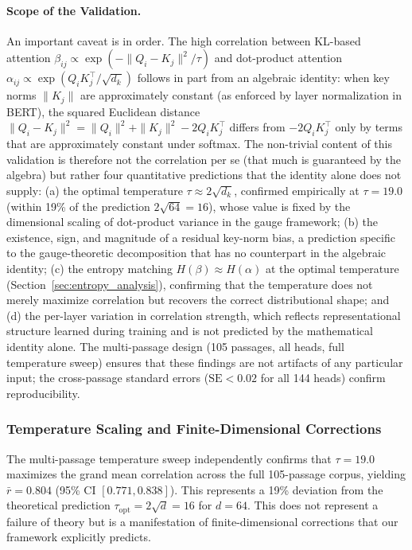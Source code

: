 \documentclass[twoside,11pt]{article}
\begin{document}
\paragraph{Scope of the Validation.}
An important caveat is in order. The high correlation between KL-based attention $\beta_{ij} \propto \exp(-\|Q_i - K_j\|^2/\tau)$ and dot-product attention $\alpha_{ij} \propto \exp(Q_i K_j^\top / \sqrt{d_k})$ follows in part from an algebraic identity: when key norms $\|K_j\|$ are approximately constant (as enforced by layer normalization in BERT), the squared Euclidean distance $\|Q_i - K_j\|^2 = \|Q_i\|^2 + \|K_j\|^2 - 2Q_i K_j^\top$ differs from $-2Q_i K_j^\top$ only by terms that are approximately constant under softmax. The non-trivial content of this validation is therefore not the correlation per se (that much is guaranteed by the algebra) but rather four quantitative predictions that the identity alone does not supply: (a) the optimal temperature $\tau \approx 2\sqrt{d_k}$, confirmed empirically at $\tau = 19.0$ (within 19\% of the prediction $2\sqrt{64} = 16$), whose value is fixed by the dimensional scaling of dot-product variance in the gauge framework; (b) the existence, sign, and magnitude of a residual key-norm bias, a prediction specific to the gauge-theoretic decomposition that has no counterpart in the algebraic identity; (c) the entropy matching $H(\beta) \approx H(\alpha)$ at the optimal temperature (Section~\ref{sec:entropy_analysis}), confirming that the temperature does not merely maximize correlation but recovers the correct distributional shape; and (d) the per-layer variation in correlation strength, which reflects representational structure learned during training and is not predicted by the mathematical identity alone. The multi-passage design (105 passages, all heads, full temperature sweep) ensures that these findings are not artifacts of any particular input; the cross-passage standard errors ($\mathrm{SE} < 0.02$ for all 144 heads) confirm reproducibility.

\subsubsection{Temperature Scaling and Finite-Dimensional Corrections}
\label{sec:temperature_scaling}

The multi-passage temperature sweep independently confirms that $\tau = 19.0$ maximizes the grand mean correlation across the full 105-passage corpus, yielding $\bar{r} = 0.804$ (95\% CI $[0.771, 0.838]$). This represents a 19\% deviation from the theoretical prediction $\tau_{\text{opt}} = 2\sqrt{d} = 16$ for $d = 64$. This does not represent a failure of theory but is a manifestation of finite-dimensional corrections that our framework explicitly predicts.
\end{document}
